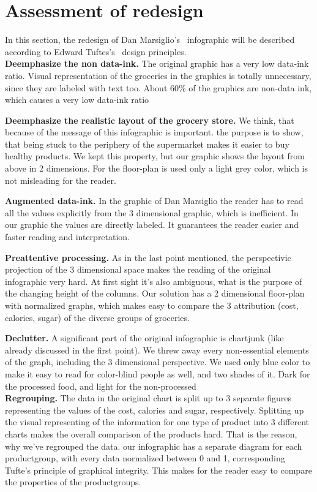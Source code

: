 \section{Assessment of redesign}

In this section, the redesign of Dan Marsiglio's~\cite{DanMarsiglio2008}
infographic will be described according to Edward Tuftes's~\cite{Tufte2001}
design principles.\\

\textbf{Deemphasize the non data-ink.} The original graphic has a very
low data-ink ratio. Visual representation of the groceries in the graphics
is totally unnecessary, since they are labeled with text too. About 60\% of
the graphics are non-data ink, which causes a very low data-ink ratio

\textbf{Deemphasize the realistic layout of the grocery store.} We
think, that because of the message of this infographic is important. the
purpose is to show, that being stuck to the periphery of the supermarket
makes it easier to buy healthy products. We kept this property, but our
graphic shows the layout from above in 2 dimensions. For the floor-plan is
used only a light grey color, which is not misleading for the reader.

\textbf{Augmented data-ink.} In the graphic of Dan Marsiglio the reader
has to read all the values explicitly from the 3 dimensional graphic, which
is inefficient. In our graphic the values are directly labeled. It
guarantees the reader easier and faster reading and interpretation.

\textbf{Preattentive processing.} As in the last point mentioned, the
perspectivic projection of the 3 dimensional space makes the reading of
the original infographic very hard. At first sight it's also ambiguous,
what is the purpose of the changing height of the columns. Our solution
has a 2 dimensional floor-plan with normalized graphs, which makes easy to
compare the 3 attribution (cost, calories, sugar) of the diverse groups of
groceries.

\textbf{Declutter.} A significant part of the original infographic is
chartjunk (like already discussed in the first point). We threw away every
non-essential elements of the graph, including the 3 dimensional
perspective. We used only blue color to make it easy to read for color-blind
people as well, and two shades of it. Dark for the processed food, and light
for the non-processed\\

\textbf{Regrouping.} The data in the original chart is split up to 3
separate figures representing the values of the cost, calories and sugar,
respectively. Splitting up the visual representing of the information for
one type of product into 3 different charts makes the overall comparison of
the products hard. That is the reason, why we've regrouped the data. our
infographic has a separate  diagram for each productgroup, with every data
normalized between 0 and 1, corresponding Tufte's principle of graphical
integrity. This makes for the reader easy to compare the properties of the
productgroups.

